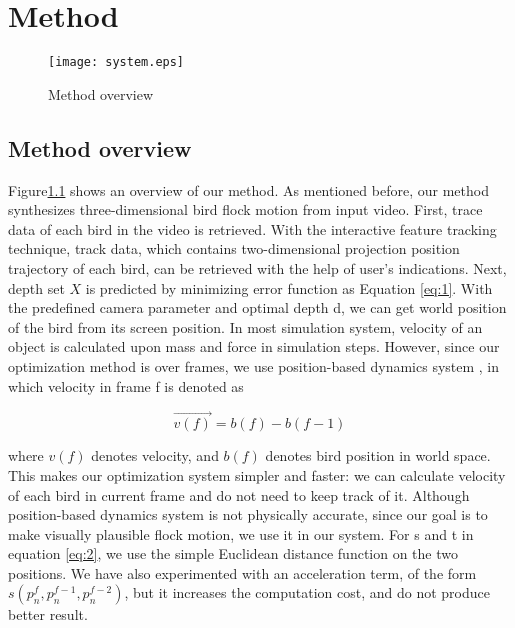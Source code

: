 \chapter{Method}


\begin{figure}[h]
 \begin{center}
  \texttt{[image: system.eps]}
 \end{center}
 \caption{Method overview}
 \label{figure:system}
\end{figure}


\section{Method overview}


Figure\ref{figure:system}  shows an overview of our method. As mentioned before, our method synthesizes three-dimensional bird flock motion from input video. First, trace data of each bird in the video is retrieved. With the interactive feature tracking technique, track data, which contains two-dimensional projection position trajectory of each bird, can be retrieved with the help of user's indications. Next, depth set $X$ is predicted by minimizing error function as Equation \ref{eq:1}. With the predefined camera parameter and optimal depth d, we can get world position of the bird from its screen position.
In most simulation system, velocity of an object is calculated upon mass and force in simulation steps. However, since our optimization method is over frames, we use position-based dynamics system \cite{PBD}, in which velocity in frame f is denoted as


\begin{equation}\label{eq:3}
 \vec{v(f)} = b(f)-b(f-1)
\end{equation}


where $v(f)$ denotes velocity, and $b(f)$ denotes bird position in world space. This makes our optimization system simpler and faster: we can calculate velocity of each bird in current frame and do not need to keep track of it. Although position-based dynamics system is not physically accurate, since our goal is to make visually plausible flock motion, we use it in our system.
For s and t in equation \ref{eq:2}, we use the simple Euclidean distance function on the two positions. We have also experimented with an acceleration term, of the form $s(p_n^f, p_n^{f-1}, p_n^{f-2})$, but it increases the computation cost, and do not produce better result.


